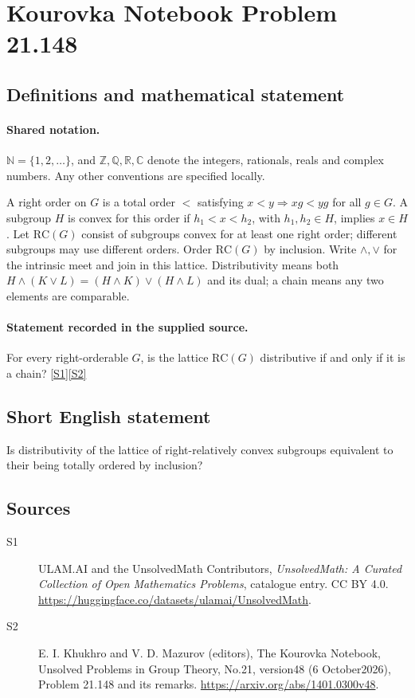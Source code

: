 \documentclass[11pt]{article}
\newcommand{\sref}[2]{\hyperlink{source:#1:#2}{[S#2]}}
\begin{document}
\section{Kourovka Notebook Problem 21.148}\label{statement}

\subsection{Definitions and mathematical statement}

\paragraph{Shared notation.}$\mathbb N=\{1,2,\ldots\}$, and $\mathbb Z,\mathbb Q,\mathbb R,\mathbb C$ denote the integers, rationals, reals and complex numbers. Any other conventions are specified locally.


A right order on $G$ is a total order $<$ satisfying $x<y\Rightarrow xg<yg$ for all $g\in G$. A subgroup $H$ is convex for this order if $h_1<x<h_2$, with $h_1,h_2\in H$, implies $x\in H$. Let $\mathrm{RC}(G)$ consist of subgroups convex for at least one right order; different subgroups may use different orders. Order $\mathrm{RC}(G)$ by inclusion. Write $\wedge,\vee$ for the intrinsic meet and join in this lattice. Distributivity means both $H\wedge(K\vee L)=(H\wedge K)\vee(H\wedge L)$ and its dual; a chain means any two elements are comparable.
\paragraph{Statement recorded in the supplied source.}
For every right-orderable $G$, is the lattice $\mathrm{RC}(G)$ distributive if and only if it is a chain? \sref{statement}{1}\sref{statement}{2}
\subsection{Short English statement}
Is distributivity of the lattice of right-relatively convex subgroups equivalent to their being totally ordered by inclusion?
\subsection{Sources}
\begin{description}
\item[\hypertarget{source:statement:1}{S1}] ULAM.AI and the UnsolvedMath Contributors, \emph{UnsolvedMath: A Curated Collection of Open Mathematics Problems}, catalogue entry. CC BY 4.0. \url{https://huggingface.co/datasets/ulamai/UnsolvedMath}.
\item[\hypertarget{source:statement:2}{S2}] E. I. Khukhro and V. D. Mazurov (editors), The Kourovka Notebook, Unsolved Problems in Group Theory, No.21, version48 (6 October2026), Problem 21.148 and its remarks. \url{https://arxiv.org/abs/1401.0300v48}.
\end{description}
\label{end:statement}
\end{document}
